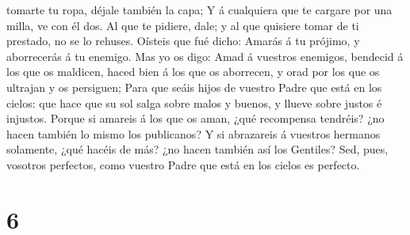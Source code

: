 tomarte tu ropa, déjale también la capa;  Y á cualquiera
que te cargare por una milla, ve con él dos.  Al que te
pidiere, dale; y al que quisiere tomar de ti prestado, no se lo rehuses.
 Oísteis que fué dicho: Amarás á tu prójimo, y aborrecerás
á tu enemigo.  Mas yo os digo: Amad á vuestros enemigos,
bendecid á los que os maldicen, haced bien á los que os aborrecen, y
orad por los que os ultrajan y os persiguen;  Para que
seáis hijos de vuestro Padre que está en los cielos: que hace que su sol
salga sobre malos y buenos, y llueve sobre justos é injustos.
 Porque si amareis á los que os aman, ¿qué recompensa
tendréis? ¿no hacen también lo mismo los publicanos?  Y si
abrazareis á vuestros hermanos solamente, ¿qué hacéis de más? ¿no hacen
también así los Gentiles?  Sed, pues, vosotros perfectos,
como vuestro Padre que está en los cielos es perfecto.

\hypertarget{section-5}{%
\section{6}\label{section-5}}

